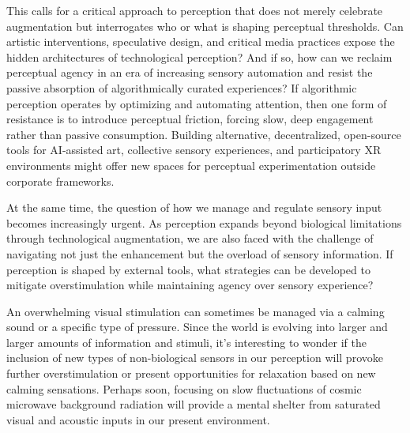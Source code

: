 This calls for a critical approach to perception that does not merely celebrate augmentation but interrogates who or what is shaping perceptual thresholds. Can artistic interventions, speculative design, and critical media practices expose the hidden architectures of technological perception? And if so, how can we reclaim perceptual agency in an era of increasing sensory automation and resist the passive absorption of algorithmically curated experiences? If algorithmic perception operates by optimizing and automating attention, then one form of resistance is to introduce perceptual friction, forcing slow, deep engagement rather than passive consumption. Building alternative, decentralized, open-source tools for AI-assisted art, collective sensory experiences, and participatory XR environments might offer new spaces for perceptual experimentation outside corporate frameworks.

At the same time, the question of how we manage and regulate sensory input becomes increasingly urgent. As perception expands beyond biological limitations through technological augmentation, we are also faced with the challenge of navigating not just the enhancement but the overload of sensory information. If perception is shaped by external tools, what strategies can be developed to mitigate overstimulation while maintaining agency over sensory experience?

An overwhelming visual stimulation can sometimes be managed via a calming sound or a specific type of pressure. Since the world is evolving into larger and larger amounts of information and stimuli, it's interesting to wonder if the inclusion of new types of non-biological sensors in our perception will provoke further overstimulation or present opportunities for relaxation based on new calming sensations. Perhaps soon, focusing on slow fluctuations of cosmic microwave background radiation will provide a mental shelter from saturated visual and acoustic inputs in our present environment.




